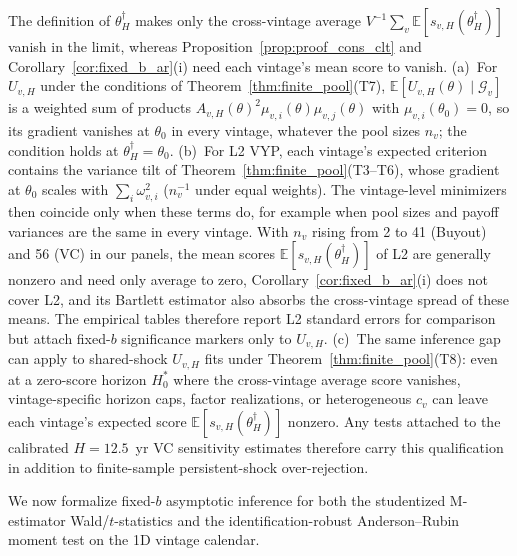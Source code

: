 \begin{remark}
\label{rem:per_vintage_centering}
The definition of $\theta_H^\dagger$ makes only the cross-vintage average $V^{-1}\sum_{v}\mathbb{E}[s_{v,H}(\theta_H^\dagger)]$ vanish in the limit, whereas Proposition~\ref{prop:proof_cons_clt} and Corollary~\ref{cor:fixed_b_ar}(i) need each vintage's mean score to vanish.
(a)~For $U_{v,H}$ under the conditions of Theorem~\ref{thm:finite_pool}(T7), $\mathbb{E}[U_{v,H}(\theta)\mid\mathcal{G}_v]$ is a weighted sum of products $A_{v,H}(\theta)^2\mu_{v,i}(\theta)\mu_{v,j}(\theta)$ with $\mu_{v,i}(\theta_0) = 0$, so its gradient vanishes at $\theta_0$ in every vintage, whatever the pool sizes $n_v$; the condition holds at $\theta_H^\dagger = \theta_0$.
(b)~For L2 VYP, each vintage's expected criterion contains the variance tilt of Theorem~\ref{thm:finite_pool}(T3--T6), whose gradient at $\theta_0$ scales with $\sum_{i}\omega_{v,i}^2$ ($n_v^{-1}$ under equal weights). The vintage-level minimizers then coincide only when these terms do, for example when pool sizes and payoff variances are the same in every vintage. With $n_v$ rising from 2 to 41 (Buyout) and 56 (VC) in our panels, the mean scores $\mathbb{E}[s_{v,H}(\theta_H^\dagger)]$ of L2 are generally nonzero and need only average to zero, Corollary~\ref{cor:fixed_b_ar}(i) does not cover L2, and its Bartlett estimator also absorbs the cross-vintage spread of these means. The empirical tables therefore report L2 standard errors for comparison but attach fixed-$b$ significance markers only to $U_{v,H}$.
(c)~The same inference gap can apply to shared-shock $U_{v,H}$ fits under Theorem~\ref{thm:finite_pool}(T8): even at a zero-score horizon $H_0^\ast$ where the cross-vintage average score vanishes, vintage-specific horizon caps, factor realizations, or heterogeneous $c_v$ can leave each vintage's expected score $\mathbb{E}[s_{v,H}(\theta_H^\dagger)]$ nonzero. Any tests attached to the calibrated $H=12.5$~yr VC sensitivity estimates therefore carry this qualification in addition to finite-sample persistent-shock over-rejection.
\end{remark}

We now formalize fixed-$b$ asymptotic inference for both the studentized M-estimator Wald/$t$-statistics and the identification-robust Anderson--Rubin moment test on the 1D vintage calendar.


